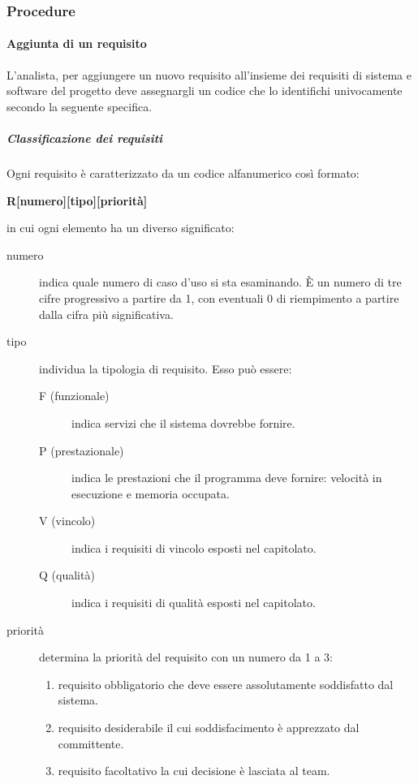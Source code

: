 \documentclass[../../norme-di-progetto.tex]{subfiles}
\begin{document}


\subsubsection{Procedure}%
\label{subs:procedure}

\paragraph{Aggiunta di un requisito}%
\label{par:aggiunta_requisito}
L'analista, per aggiungere un nuovo requisito all'insieme dei requisiti di sistema e software del progetto deve assegnargli un codice che lo identifichi univocamente secondo la seguente specifica.

\subparagraph{Classificazione dei requisiti}%
\label{subp:classificazione_dei_requisiti}

Ogni requisito è caratterizzato da un codice alfanumerico così formato:
\begin{center}
  \textbf{R[numero][tipo][priorità]}
\end{center}
in cui ogni elemento ha un diverso significato:
\begin{description}
  \item [numero] indica quale numero di caso d'uso si sta esaminando. È un numero di tre cifre progressivo a partire da 1, con eventuali 0 di riempimento a partire dalla cifra più significativa.
  \item [tipo] individua la tipologia di requisito. Esso può essere:
        \begin{description}
          \item [F (funzionale)] indica servizi che il sistema dovrebbe fornire.
          \item [P (prestazionale)] indica le prestazioni che il programma deve fornire: velocità in esecuzione e memoria occupata.
          \item [V (vincolo)] indica i requisiti di vincolo esposti nel capitolato.
          \item [Q (qualità)] indica i requisiti di qualità esposti nel capitolato.
        \end{description}
  \item [priorità] determina la priorità del requisito con un numero da 1 a 3:
        \begin{enumerate}
          \item requisito obbligatorio che deve essere assolutamente soddisfatto dal sistema.
          \item requisito desiderabile il cui soddisfacimento è apprezzato dal committente.
          \item requisito facoltativo la cui decisione è lasciata al team.
        \end{enumerate}
\end{description}
\end{document}
